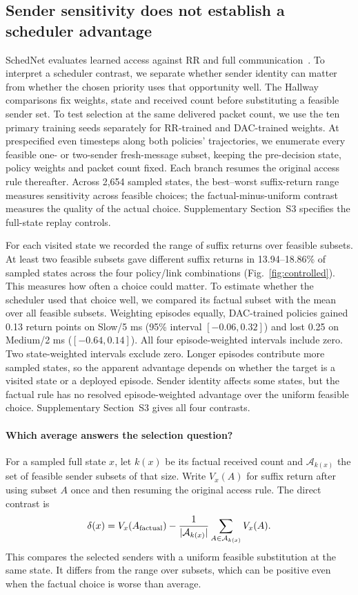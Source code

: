 \documentclass[a4paper,fleqn]{cas-dc}
\begin{document}
\subsection{Sender sensitivity does not establish a scheduler advantage}\label{sec:selection}
SchedNet evaluates learned access against RR and full communication~\citep{kim2019schedule}. To interpret a scheduler contrast, we separate whether sender identity can matter from whether the chosen priority uses that opportunity well. The Hallway comparisons fix weights, state and received count before substituting a feasible sender set.
To test selection at the same delivered packet count, we use the ten primary training seeds separately for RR-trained and DAC-trained weights. At prespecified even timesteps along both policies' trajectories, we enumerate every feasible one- or two-sender fresh-message subset, keeping the pre-decision state, policy weights and packet count fixed. Each branch resumes the original access rule thereafter. Across 2,654 sampled states, the best--worst suffix-return range measures sensitivity across feasible choices; the factual-minus-uniform contrast measures the quality of the actual choice. Supplementary Section~S3 specifies the full-state replay controls.

For each visited state we recorded the range of suffix returns over feasible subsets. At least two feasible subsets gave different suffix returns in 13.94--18.86\% of sampled states across the four policy/link combinations (Fig.~\ref{fig:controlled}). This measures how often a choice could matter. To estimate whether the scheduler used that choice well, we compared its factual subset with the mean over all feasible subsets. Weighting episodes equally, DAC-trained policies gained 0.13 return points on Slow/5 ms (95\% interval $[-0.06,0.32]$) and lost 0.25 on Medium/2 ms ($[-0.64,0.14]$). All four episode-weighted intervals include zero. Two state-weighted intervals exclude zero. Longer episodes contribute more sampled states, so the apparent advantage depends on whether the target is a visited state or a deployed episode. Sender identity affects some states, but the factual rule has no resolved episode-weighted advantage over the uniform feasible choice. Supplementary Section~S3 gives all four contrasts.
\paragraph{Which average answers the selection question?}
For a sampled full state $x$, let $k(x)$ be its factual received count and $\mathcal A_{k(x)}$ the set of feasible sender subsets of that size. Write $V_x(A)$ for suffix return after using subset $A$ once and then resuming the original access rule. The direct contrast is
\begin{equation}
 \delta(x)=V_x(A_{\rm factual})-
 \frac{1}{|\mathcal A_{k(x)}|}\sum_{A\in\mathcal A_{k(x)}}V_x(A).
 \label{eq:subset_contrast}
\end{equation}
This compares the selected senders with a uniform feasible substitution at the same state. It differs from the range over subsets, which can be positive even when the factual choice is worse than average.
\end{document}
